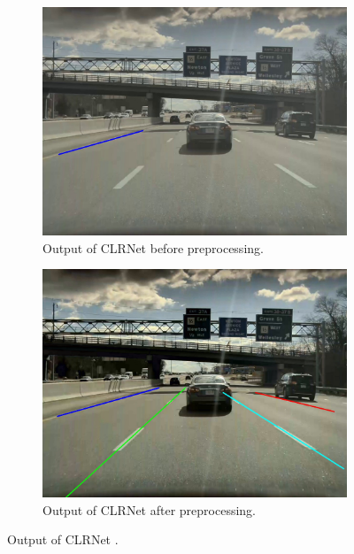 \begin{figure}
    \centering
    \begin{subfigure}{0.95\linewidth}
        \centering
        \includegraphics[width=\textwidth]{images/CLRNet_without_proc.jpg}
        \caption{Output of CLRNet before preprocessing.}
        \label{fig:CLRNet_output}
    \end{subfigure}
    \begin{subfigure}{0.95\linewidth}
        \centering
        \includegraphics[width=\textwidth]{images/CLRNet_with_proc.jpg}
        \caption{Output of CLRNet after preprocessing.}
        \label{fig:CLRNet_output_preprocessed}
    \end{subfigure}
    \caption{Output of CLRNet \cite{CLRNet}.}
\end{figure}

